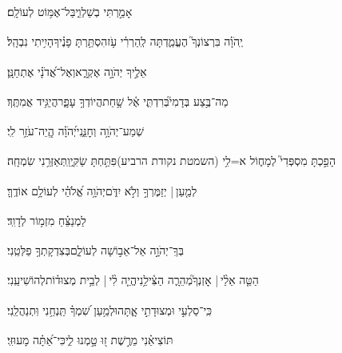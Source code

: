 \documentclass[12pt]{article}
\newcommand{\loc}[1]{\textsuperscript{\locf{#1}}}
\begin{document}
{\loc{ ז}~}‏ אָמַ֣רְתִּי בְשַׁלְוִ֑י{\hfill}בַּל־אֶמּ֥וֹט לְעוֹלָֽם׃\par

{\loc{ ח}~}‏יְֽהֹוָ֗ה בִּרְצוֹנְךָ֮ הֶעֱמַ֢דְתָּה לְֽהַרְרִ֫י עֹ֥ז{\hfill}הִסְתַּ֥רְתָּ פָנֶ֗יךָ{\hfill}הָיִ֥יתִי נִבְהָֽל׃\par

{\loc{ ט}~}‏אֵלֶ֣יךָ יְהֹוָ֣ה אֶקְרָ֑א{\hfill}וְאֶל־אֲ֝דֹנָ֗י אֶתְחַנָּֽן׃\par

{\loc{ י}~}‏מַה־בֶּ֥צַע בְּדָמִי֮{\hfill}בְּרִדְתִּ֢י אֶ֫ל שָׁ֥חַת\newline\hspace*{.5em}הֲיוֹדְךָ֥ עָפָ֑ר{\hfill}הֲיַגִּ֥יד אֲמִתֶּֽךָ׃\par

{\loc{ יא}~}‏שְׁמַע־יְהֹוָ֥ה וְחׇנֵּ֑נִי{\hfill}יְ֝הֹוָ֗ה הֱֽיֵה־עֹזֵ֥ר לִֽי׃\par

{\loc{ יב}~}‏הָפַ֣כְתָּ מִסְפְּדִי֮ לְמָח֢וֹל א=לִ֥י (השמטת נקודת הרביע){\hfill}פִּתַּ֥חְתָּ שַׂקִּ֑י{\hfill}וַֽתְּאַזְּרֵ֥נִי שִׂמְחָֽה׃\par

{\loc{ יג}~}‏לְמַ֤עַן |  יְזַמֶּרְךָ֣  וְלֹ֣א יִדֹּ֑ם{\hfill}יְהֹוָ֥ה אֱ֝לֹהַ֗י לְעוֹלָ֥ם אוֹדֶֽךָּ׃\par\pend
\ledpb
\pstart[\subsection*{\textcolor{red}{פרק לא}}]\label{פרק לא}
{\loc{ א}~}‏לַמְנַצֵּ֗חַ מִזְמ֥וֹר לְדָוִֽד׃\par

{\loc{ ב}~}‏בְּךָֽ־יְהֹוָ֣ה {\hfill}אַל־אֵב֣וֹשָׁה לְעוֹלָ֑ם\newline\hspace*{.5em}בְּצִדְקָתְךָ֥ פַלְּטֵֽנִי׃\par

{\loc{ ג}~}‏הַטֵּ֤ה אֵלַ֨י |  אׇזְנְךָ֮{\hfill}מְהֵרָ֢ה הַצִּ֫ילֵ֥נִי\newline\hspace*{.5em}הֱיֵ֤ה לִ֨י |   לְבֵ֥ית מְצוּד֗וֹת{\hfill}לְהוֹשִׁיעֵֽנִי׃\par

{\loc{ ד}~}‏כִּֽי־סַלְעִ֣י וּמְצוּדָתִ֣י אָ֑תָּה{\hfill}וּלְמַ֥עַן שִׁ֝מְךָ֗ תַּֽנְחֵ֥נִי וּֽתְנַהֲלֵֽנִי׃\par

{\loc{ ה}~}‏תּוֹצִיאֵ֗נִי מֵרֶ֣שֶׁת ז֭וּ טָ֣מְנוּ לִ֑י{\hfill}כִּי־אַ֝תָּ֗ה מָעוּזִּֽי׃\par
\end{document}
